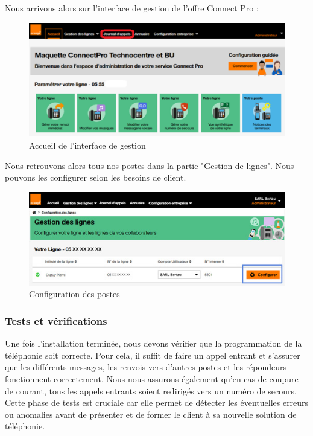 \documentclass[12pt, a4paper]{article}
\begin{document}
Nous arrivons alors sur l'interface de gestion
de l'offre Connect Pro : 
\begin{figure}[h]
	\centering
	\includegraphics[scale=1.3]{img/accueil.png}
	\caption{Accueil de l'interface de gestion \cite{r3}}
\end{figure}

Nous retrouvons alors tous nos postes 
dans la partie "Gestion de lignes". Nous pouvons
les configurer selon les besoins de client. 

\begin{figure}[h]
	\centering
	\includegraphics[scale=0.65]{img/configuration.jpg}
	\caption{Configuration des postes \cite{r4}}
\end{figure}

\newpage
\subsubsection{Tests et vérifications}
Une fois l'installation terminée, nous devons
vérifier que la programmation de la téléphonie 
soit correcte. Pour cela, il suffit de faire 
un appel entrant et s'assurer que les différents
messages, les renvois vers d'autres postes et
les répondeurs fonctionnent correctement. 
Nous nous assurons également qu'en cas 
de coupure de courant, tous les appels entrants
soient redirigés vers un numéro de secours.\\

Cette phase de tests est cruciale car elle permet 
de détecter les éventuelles erreurs ou anomalies
avant de présenter et de former le client 
à sa nouvelle solution de téléphonie.\\
\end{document}
